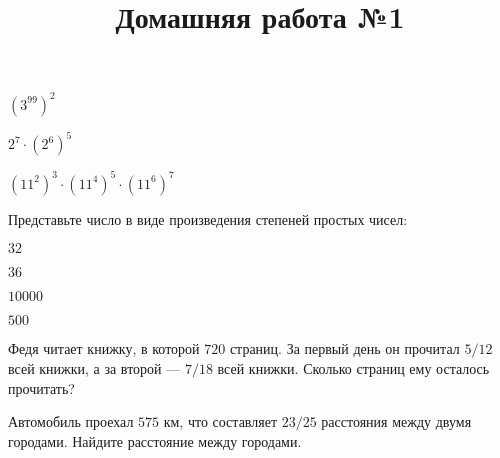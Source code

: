 \begin{listofex}
\begin{enumcols}[itemcolumns=2]
		\item \( (3^{99})^2 \)
		\item \( 2^7\cdot(2^6)^5 \)
		\item \( (11^2)^3\cdot(11^4)^5\cdot(11^6)^7 \)
	\end{enumcols}
	\item Представьте число в виде произведения степеней простых чисел:
	\begin{enumcols}[itemcolumns=4]
		\item \( 32 \)
		\item \( 36 \)
		\item \( 10000 \)
		\item \( 500 \)
	\end{enumcols}
	\item Федя читает книжку, в которой \( 720 \) страниц. За первый день он прочитал \( 5/12 \) всей книжки, а за второй --- \( 7/18 \) всей книжки. Сколько страниц ему осталось прочитать?
	\item Автомобиль проехал \( 575 \) км, что составляет \( 23/25 \) расстояния между двумя городами. Найдите расстояние между городами.
\end{listofex}
\newpage
\title{Домашняя работа №1}
